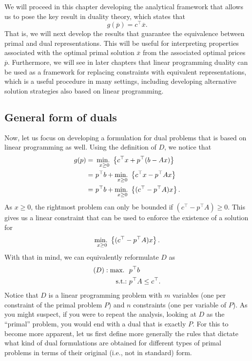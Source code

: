 We will proceed in this chapter developing the analytical framework that allows us to pose the key result in duality theory, which states that 
%
\begin{equation*}
	g(\overline{p}) = c^\top \overline{x}.	
\end{equation*}
%
That is, we will next develop the results that guarantee the equivalence between primal and dual representations. This will be useful for interpreting properties associated with the optimal primal solution $\overline{x}$ from the associated optimal prices $\overline{p}$. Furthermore, we will see in later chapters that linear programming duality can be used as a framework for replacing constraints with equivalent representations, which is a useful procedure in many settings, including developing alternative solution strategies also based on linear programming. 


\subsection{General form of duals}

Now, let us focus on developing a formulation for dual problems that is based on linear programming as well. Using the definition of $D$, we notice that
%
\begin{align*}
	g(p) = \ & \mathop{\text{min.~}}_{x \geq 0}  \left\{ c^\top x + p^\top (b - Ax) \right \}	\\
	= \ & p^\top b + \mathop{\text{min.~}}_{x \geq 0}  \left\{ c^\top x - p^\top Ax \right \}    \\
    = \ & p^\top b + \mathop{\text{min.~}}_{x \geq 0}  \left\{ (c^\top - p^\top A)x \right \}.  
\end{align*} 
%
As $x \ge 0$, the rightmost problem can only be bounded if $(c^\top - p^\top A) \ge 0$. This gives us a linear constraint that can be used to enforce the existence of a solution for 
%
\begin{equation*}
	\mathop{\text{min.~}}_{x \geq 0}  \left\{ (c^\top - p^\top A)x \right \}.
\end{equation*}
%
With that in mind, we can equivalently reformulate $D$ as
%
\begin{align*}
	(D) : \mathop{\text{max.~}} \ & p^\top b \\
	\mathop{\text{s.t.:~}} 	  & p^\top A \leq c^\top.
\end{align*}	
%
Notice that $D$ is a linear programming problem with $m$ variables (one per constraint of the primal problem $P$) and $n$ constraints (one per variable of $P$). As you might suspect, if you were to repeat the analysis, looking at $D$ as the ``primal'' problem, you would end with a dual that is exactly $P$. For this to become more apparent, let us first define more generally the rules that dictate what kind of dual formulations are obtained for different types of primal problems in terms of their original (i.e., not in standard) form. 

